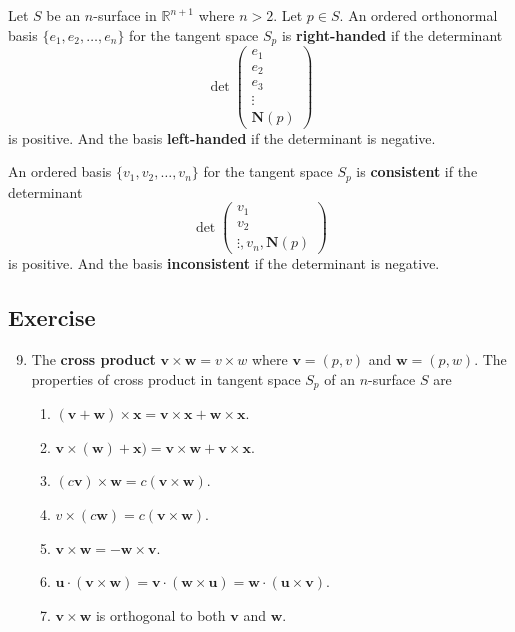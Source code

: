 \begin{definition}
	Let $S$ be an $n$-surface in $\mathbb{R}^{n+1}$ where $n > 2$.
	Let $p \in S$.
	An ordered orthonormal basis $\{ e_1, e_2, \dots, e_n \}$ for the tangent space $S_p$ is \textbf{right-handed} if the determinant $$\det \begin{pmatrix} e_1 \\ e_2 \\ e_3 \\ \vdots \\ \boldsymbol{N}(p) \end{pmatrix}$$ is positive.
	And the basis \textbf{left-handed} if the determinant is negative.
\end{definition}

\begin{definition}
	An ordered basis $\{ v_1, v_2,\dots,v_n \}$ for the tangent space $S_p$ is \textbf{consistent} if the determinant $$\det\begin{pmatrix} v_1 \\ v_2 \\ \vdots,v_n,\boldsymbol{N}(p) \end{pmatrix}$$ is positive. And the basis \textbf{inconsistent} if the determinant is negative.
\end{definition}

\subsection*{Exercise}
\begin{enumerate}
	\setcounter{enumi}{8}
\item The \textbf{cross product} $\boldsymbol{v} \times \boldsymbol{w} = v \times w$ where $\boldsymbol{v} = (p,v)$ and $\boldsymbol{w} = (p,w)$. The properties of cross product in tangent space $S_p$ of an $n$-surface $S$ are
	\begin{enumerate}
		\item $(\boldsymbol{v} + \boldsymbol{w}) \times \boldsymbol{x} = \boldsymbol{v} \times \boldsymbol{x} + \boldsymbol{w} \times \boldsymbol{x}$.
		\item $\boldsymbol{v} \times (\boldsymbol{w}) + \boldsymbol{x}) = \boldsymbol{v} \times \boldsymbol{w} + \boldsymbol{v} \times \boldsymbol{x}$.
		\item $(c\boldsymbol{v}) \times \boldsymbol{w} = c(\boldsymbol{v} \times \boldsymbol{w})$.
		\item $v \times (c\boldsymbol{w}) = c(\boldsymbol{v} \times \boldsymbol{w})$.
		\item $\boldsymbol{v} \times \boldsymbol{w} = - \boldsymbol{w} \times \boldsymbol{v}$.
		\item $\boldsymbol{u} \cdot (\boldsymbol{v} \times \boldsymbol{w}) = \boldsymbol{v} \cdot (\boldsymbol{w} \times \boldsymbol{u}) = \boldsymbol{w} \cdot (\boldsymbol{u} \times \boldsymbol{v})$.
		\item $\boldsymbol{v} \times \boldsymbol{w}$ is orthogonal to both $\boldsymbol{v}$ and $\boldsymbol{w}$.
	\end{enumerate}
\end{enumerate}


